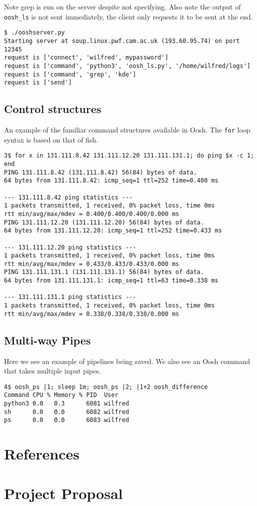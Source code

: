 \documentclass[12pt,twoside,notitlepage]{report}
\begin{document}
Note grep is run on the server despite not specifying. Also note the
output of {\tt oosh\_ls} is not sent immediately, the client only
requests it to be sent at the end.

\begin{verbatim}
$ ./ooshserver.py
Starting server at soup.linux.pwf.cam.ac.uk (193.60.95.74) on port 12345
request is ['connect', 'wilfred', mypassword']
request is ['command', 'python3', 'oosh_ls.py', '/home/wilfred/logs']
request is ['command', 'grep', 'kde']
request is ['send']
\end{verbatim}

\section{Control structures}
\label{forexample}
An example of the familiar command structures available in Oosh. The {\tt for}
loop syntax is based on that of fish.
\begin{verbatim}
3$ for x in 131.111.8.42 131.111.12.20 131.111.131.1; do ping $x -c 1; end
PING 131.111.8.42 (131.111.8.42) 56(84) bytes of data.
64 bytes from 131.111.8.42: icmp_seq=1 ttl=252 time=0.400 ms

--- 131.111.8.42 ping statistics ---
1 packets transmitted, 1 received, 0% packet loss, time 0ms
rtt min/avg/max/mdev = 0.400/0.400/0.400/0.000 ms
PING 131.111.12.20 (131.111.12.20) 56(84) bytes of data.
64 bytes from 131.111.12.20: icmp_seq=1 ttl=252 time=0.433 ms

--- 131.111.12.20 ping statistics ---
1 packets transmitted, 1 received, 0% packet loss, time 0ms
rtt min/avg/max/mdev = 0.433/0.433/0.433/0.000 ms
PING 131.111.131.1 (131.111.131.1) 56(84) bytes of data.
64 bytes from 131.111.131.1: icmp_seq=1 ttl=63 time=0.338 ms

--- 131.111.131.1 ping statistics ---
1 packets transmitted, 1 received, 0% packet loss, time 0ms
rtt min/avg/max/mdev = 0.338/0.338/0.338/0.000 ms
\end{verbatim}

\section{Multi-way Pipes}
Here we see an example of pipelines being saved. We also see an Oosh command
that takes multiple input pipes.
\begin{verbatim}
4$ oosh_ps |1; sleep 1m; oosh_ps |2; |1+2 oosh_difference
Command CPU % Memory % PID  User
python3 0.0   0.3      6081 wilfred
sh      0.0   0.0      6082 wilfred
ps      0.0   0.0      6083 wilfred
\end{verbatim}

\chapter{References}

\chapter{Project Proposal}
\parindent 0pt
\parskip 6pt

\end{document}
